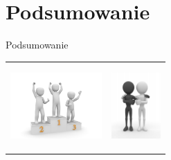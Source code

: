 \documentclass{beamer}
\begin{document}
\section{Podsumowanie}

\begin{frame}{}
\begin{center}
\huge{Podsumowanie}
\end{center}
\end{frame}

\begin{frame}{}
\begin{table}
     \begin{small}
	\begin{tabular}{ p{5cm} p{5cm} }
	
	\begin{minipage}{.5\textwidth}
	\begin{center}
  		\includegraphics[height=2.5cm]{PresentationWinner.jpg}
	\end{center}
   	 \end{minipage}
   	 &	
	\begin{minipage}{.5\textwidth}	
	\begin{center}
  		\includegraphics[height=2.5cm]{PresentationConnect.jpg}
	\end{center}
   	 \end{minipage}

	\end{tabular}
     \end{small}
\end{table}
\end{frame}
\end{document}
